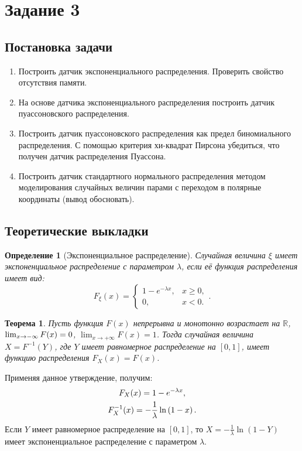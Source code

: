 \documentclass[11pt]{article}
\newtheorem{theorem}{Теорема}
\newtheorem{definition}{Определение}
\newcommand*{\hm}[1]{#1\nobreak\discretionary{}{\hbox{$\mathsurround=0pt #1$}}{}}
\begin{document}
\section{Задание 3}
\subsection{Постановка задачи}
\begin{enumerate}
\item Построить датчик экспоненциального распределения. Проверить свойство отсутствия памяти.
\item На основе датчика экспоненциального распределения построить датчик пуассоновского распределения.
\item Построить датчик пуассоновского распределения как предел биномиального распределения. С помощью критерия хи-квадрат Пирсона убедиться, что получен датчик распределения Пуассона.
\item Построить датчик стандартного нормального распределения методом моделирования случайных величин парами с переходом в полярные координаты (вывод обосновать).
\end{enumerate}
\subsection{Теоретические выкладки}
\begin{definition}[Экспоненциальное распределение]
Случайная величина $\xi$ имеет экспоненциальное распределение с параметром $\lambda$, если её функция распределения имеет вид:
$$
F_{\xi} (x) = \begin{cases}
1 - e^{-\lambda x}, & x \geqslant 0, \\
0, & x < 0.
\end{cases}.
$$
\end{definition}

\begin{theorem}
\label{inverse_function}
Пусть функция $F(x)$ непрерывна и монотонно возрастает на $\mathbb{R}$, $\lim_{x \to -\infty} F(x) \hm= 0$, $\lim_{x \to +\infty} F(x) = 1$. Тогда случайная величина $X = F^{-1}(Y)$, где $Y$ имеет равномерное распределение на $[0, 1]$, имеет функцию распределения $F_X(x) = F(x)$.
\end{theorem}

Применяя данное утверждение, получим:
\begin{gather}
F_X(x) = 1 - e^{-\lambda x}, \notag \\
F_X^{-1}(x) = -\frac{1}{\lambda}\ln\left( 1 - x \right). \notag
\end{gather}
Если $Y$ имеет равномерное распределение на $[0, 1]$, то $X = -\frac{1}{\lambda}\ln\left( 1-Y \right)$ имеет экспоненциальное распределение с параметром $\lambda$.
\end{document}
